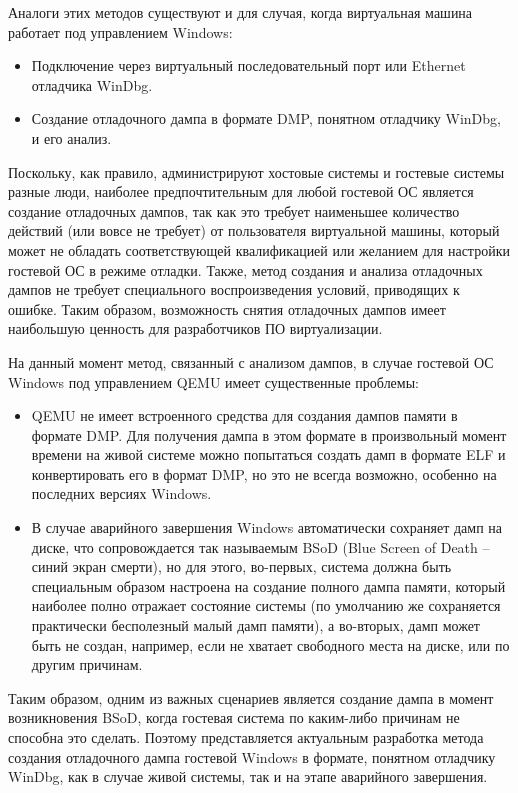 \documentclass{mipt-thesis-bs}
\begin{document}
Аналоги этих методов существуют и для случая, когда виртуальная машина работает под управлением Windows:

\begin{itemize}
\item Подключение через виртуальный последовательный порт или Ethernet отладчика WinDbg\cite{qemu-win}.
\item Создание отладочного дампа в формате DMP, понятном отладчику WinDbg, и его анализ.
\end{itemize}

Поскольку, как правило, администрируют хостовые системы и гостевые системы разные люди, наиболее предпочтительным для любой гостевой ОС является создание отладочных дампов, так как это требует наименьшее количество действий (или вовсе не требует) от пользователя виртуальной машины, который может не обладать соответствующей квалификацией или желанием для настройки гостевой ОС в режиме отладки\cite{windbgvm}. Также, метод создания и анализа отладочных дампов не требует специального воспроизведения условий, приводящих к ошибке. Таким образом, возможность снятия отладочных дампов имеет наибольшую ценность для разработчиков ПО виртуализации.

На данный момент метод, связанный с анализом дампов, в случае гостевой ОС Windows под управлением QEMU имеет существенные проблемы:

\begin{itemize}
\item QEMU не имеет встроенного средства для создания дампов памяти в формате DMP. Для получения дампа в этом формате в произвольный момент времени на живой системе можно попытаться создать дамп в формате ELF и конвертировать его в формат DMP, но это не всегда возможно, особенно на последних версиях Windows.
\item В случае аварийного завершения Windows автоматически сохраняет дамп на диске, что сопровождается так называемым BSoD (Blue Screen of Death -- синий экран смерти), но для этого, во-первых, система должна быть специальным образом настроена на создание полного дампа памяти\cite{dumphowto}, который наиболее полно отражает состояние системы (по умолчанию же сохраняется практически бесполезный малый дамп памяти), а во-вторых, дамп может быть не создан, например, если не хватает свободного места на диске, или по другим причинам\cite{nodump}.
\end{itemize}

Таким образом, одним из важных сценариев является создание дампа в момент возникновения BSoD, когда гостевая система по каким-либо причинам не способна это сделать. Поэтому представляется актуальным разработка метода создания отладочного дампа гостевой Windows в формате, понятном отладчику WinDbg, как в случае живой системы, так и на этапе аварийного завершения.
\end{document}
